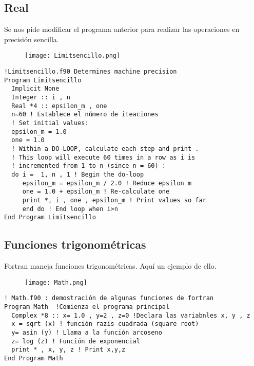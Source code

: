 \documentclass[12pt]{article}
\begin{document}
\subsection{Real}

Se nos pide modificar el programa anterior para realizar las operaciones en precisión sencilla.

\begin{figure}[h]

\centering

\texttt{[image: Limitsencillo.png]}

\end{figure}

\begin{verbatim}
!Limitsencillo.f90 Determines machine precision
Program Limitsencillo
  Implicit None
  Integer :: i , n
  Real *4 :: epsilon_m , one
  n=60 ! Establece el número de iteaciones
  ! Set initial values:
  epsilon_m = 1.0
  one = 1.0
  ! Within a DO-LOOP, calculate each step and print .
  ! This loop will execute 60 times in a row as i is
  ! incremented from 1 to n (since n = 60) :
  do i =  1, n , 1 ! Begin the do-loop
     epsilon_m = epsilon_m / 2.0 ! Reduce epsilon m
     one = 1.0 + epsilon_m ! Re-calculate one
     print *, i , one , epsilon_m ! Print values so far
     end do ! End loop when i>n
End Program Limitsencillo 
\end{verbatim}

\subsection{Funciones trigonométricas}

Fortran maneja funciones trigonométricas. Aquí un ejemplo de ello.

\begin{figure}[h]

\centering

\texttt{[image: Math.png]}

\end{figure}

\begin{verbatim}
! Math.f90 : demostración de algunas funciones de fortran
Program Math  !Comienza el programa principal
  Complex *8 :: x= 1.0 , y=2 , z=0 !Declara las variabnles x, y , z
  x = sqrt (x) ! función razís cuadrada (square root)
  y= asin (y) ! Llama a la función arcoseno
  z= log (z) ! Función de exponencial
  print * , x, y, z ! Print x,y,z
End Program Math
\end{verbatim}
\end{document}
